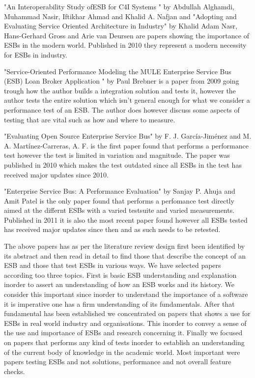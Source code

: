 \documentclass{llncs}
\begin{document}
"An Interoperability  Study  ofESB for C4I  Systems " \cite{Alghamdi2010} by Abdullah Alghamdi, Muhammad Nasir, Iftikhar Ahmad and Khalid A. Nafjan and  "Adopting and Evaluating Service Oriented Architecture in Industry" by Khalid Adam Nasr, Hans-Gerhard Gross and Arie van Deursen are papers showing the importance of ESBs in the modern world. Published in 2010 they represent a modern necessity for ESBs in industry.


"Service-Oriented Performance Modeling the MULE Enterprise Service Bus (ESB) Loan Broker Application " \cite{Brebner2009} by Paul Brebner is a paper from 2009 going trough how the author builds a integration solution and tests it, however the author tests the entire solution which isn't general enough for what we consider a performance test of an ESB. The author does however discuss some aspects of testing that are vital such as how and where to measure.

"Evaluating Open Source Enterprise Service Bus" \cite{Garcia2010} by F. J. García-Jiménez and M. A. Martínez-Carreras, A. F. is the first paper found that performs a performance test however the test is limited in variation and magnitude. The paper was published in 2010 which makes the test outdated since all ESBs in the test has received major updates since 2010.


"Enterprise Service Bus: A Performance Evaluation" \cite{Sanjay2011} by Sanjay P. Ahuja and Amit Patel  is the only paper found that performs a perfomance test directly aimed at the differnt ESBs with a varied testsuite and varied measurements. Published in 2011 it is also the most recent paper found however all ESBs tested has received major updates since then and as such needs to be retested.

The above papers has as per the literature review design first been identified by its abstract and then read in detail to find those that describe the concept of an ESB and those that test ESBs in various ways. We have selected papers according too three topics. First is basic ESB understanding and explanation inorder to assert an understanding of how an ESB works and its history. We consider this important since inorder to understand the importance of a software it is imperative one has a firm understanding of its fundamentals. After that fundamental has been established we concentrated on papers that shows a use for ESBs in real world industry and organisations. This inorder to convey a sense of the use and importance of ESBs and research concerning it.
Finally we focused on papers that performs any kind of tests inorder to establish an understanding of the current body of knowledge in the academic world. Most important were papers testing ESBs and not solutions, performance and not overall feature checks.
\end{document}
